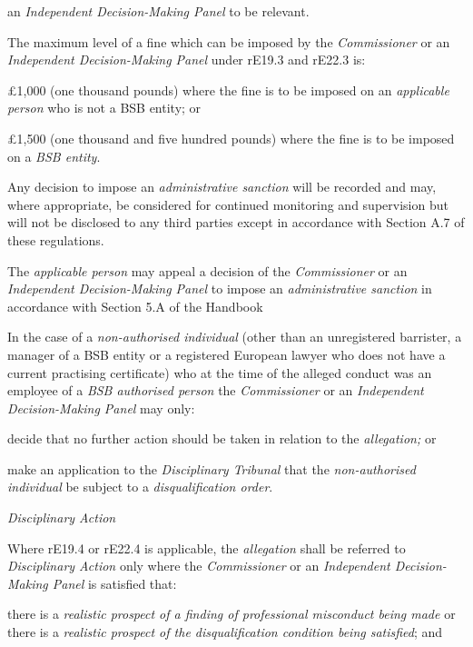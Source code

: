 an \emph{Independent Decision-Making Panel }to be relevant.\\
\par
The maximum level of a fine which can be imposed by
the \emph{Commissioner }or an \emph{Independent Decision-Making
Panel }under rE19.3 and rE22.3 is:\\\nl \item £1,000 (one thousand pounds) where the fine is to be imposed on
an \emph{applicable person} who is not a BSB entity; or\item £1,500 (one thousand and five hundred pounds) where the fine is to be
imposed on a \emph{BSB entity}.\ln
{}\par
Any decision to impose an \emph{administrative sanction} will be
recorded and may, where appropriate, be considered for continued
monitoring and supervision but will not be disclosed to any third
parties except in accordance with Section A.7 of these regulations.\\
\par
The \emph{applicable person} may appeal a decision of
the \emph{Commissioner }or an \emph{Independent Decision-Making
Panel }to impose an \emph{administrative sanction} in accordance with
Section 5.A of the Handbook\\
\par
In the case of a \emph{non-authorised individual} (other than an
unregistered barrister, a manager of a BSB entity or a registered
European lawyer who does not have a current practising certificate) who
at the time of the alleged conduct was an employee of a \emph{BSB
authorised person} the \emph{Commissioner }or an \emph{Independent
Decision-Making Panel }may only:\\\nl \item decide that no further action should be taken in relation to
the \emph{allegation;} or\item make an application to the \emph{Disciplinary Tribunal} that
the \emph{non-authorised individual} be subject to
a \emph{disqualification order}.\ln
{}\par
\emph{Disciplinary Action}\par
{}\par
Where rE19.4 or rE22.4 is applicable, the \emph{allegation} shall be
referred to \emph{Disciplinary Action} only where
the \emph{Commissioner }or an \emph{Independent Decision-Making
Panel }is satisfied that:\\\nl \item there is a \emph{realistic prospect of a finding of professional
misconduct being made} or there is a \emph{realistic prospect of the
disqualification condition being satisfied}; and
